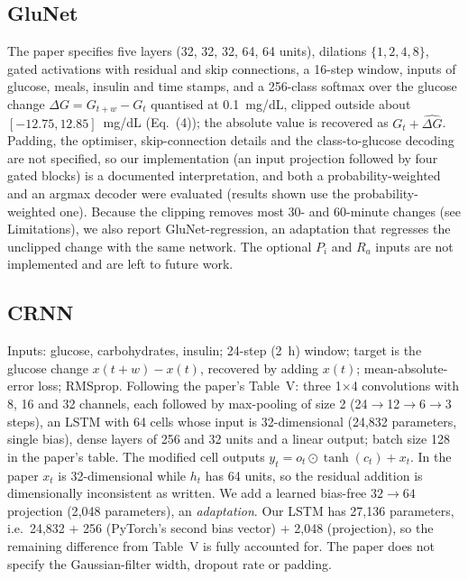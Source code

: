 \documentclass[conference]{IEEEtran}
\begin{document}
\subsection{GluNet}
The paper specifies five layers (32, 32, 32, 64, 64 units), dilations $\{1,2,4,8\}$, gated activations with residual and skip connections, a 16-step window, inputs of glucose, meals, insulin and time stamps, and a 256-class softmax over the glucose change $\Delta G=G_{t+w}-G_t$ quantised at 0.1~mg/dL, clipped outside about $[-12.75,12.85]$~mg/dL (Eq.~(4)); the absolute value is recovered as $G_t+\widehat{\Delta G}$. Padding, the optimiser, skip-connection details and the class-to-glucose decoding are not specified, so our implementation (an input projection followed by four gated blocks) is a documented interpretation, and both a probability-weighted and an argmax decoder were evaluated (results shown use the probability-weighted one). Because the clipping removes most 30- and 60-minute changes (see Limitations), we also report GluNet-regression, an adaptation that regresses the unclipped change with the same network. The optional $P_i$ and $R_a$ inputs are not implemented and are left to future work.

\subsection{CRNN}
Inputs: glucose, carbohydrates, insulin; 24-step (2~h) window; target is the glucose change $x(t+w)-x(t)$, recovered by adding $x(t)$; mean-absolute-error loss; RMSprop. Following the paper's Table~V: three 1$\times$4 convolutions with 8, 16 and 32 channels, each followed by max-pooling of size 2 (24$\to$12$\to$6$\to$3 steps), an LSTM with 64 cells whose input is 32-dimensional (24{,}832 parameters, single bias), dense layers of 256 and 32 units and a linear output; batch size 128 in the paper's table. The modified cell outputs $y_t=o_t\odot\tanh(c_t)+x_t$. In the paper $x_t$ is 32-dimensional while $h_t$ has 64 units, so the residual addition is dimensionally inconsistent as written. We add a learned bias-free $32\to64$ projection (2{,}048 parameters), an \emph{adaptation}. Our LSTM has 27{,}136 parameters, i.e.\ 24{,}832 $+$ 256 (PyTorch's second bias vector) $+$ 2{,}048 (projection), so the remaining difference from Table~V is fully accounted for. The paper does not specify the Gaussian-filter width, dropout rate or padding.
\end{document}
